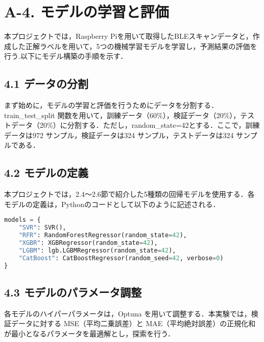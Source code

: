\section*{A-4. モデルの学習と評価}
本プロジェクトでは，Raspberry Piを用いて取得したBLEスキャンデータと，作成した正解ラベルを用いて，5つの機械学習モデルを学習し，予測結果の評価を行う.以下にモデル構築の手順を示す．

\subsection*{4.1 データの分割}
まず始めに，モデルの学習と評価を行うためにデータを分割する．train\_test\_split 関数を用いて，訓練データ（60\%），検証データ（20\%），テストデータ（20\%）に分割する．ただし，random\_state=42とする．ここで，訓練データは972 サンプル，検証データは324 サンプル，テストデータは324 サンプルである．

\subsection*{4.2 モデルの定義}
本プロジェクトでは，2.4～2.6節で紹介した5種類の回帰モデルを使用する．各モデルの定義は，Pythonのコードとして以下のように記述される．
\begin{lstlisting}[style=mystyle, language=Python, caption=回帰モデルの定義, label={models}]
models = {
    "SVR": SVR(),
    "RFR": RandomForestRegressor(random_state=42),
    "XGBR": XGBRegressor(random_state=42),
    "LGBM": lgb.LGBMRegressor(random_state=42),
    "CatBoost": CatBoostRegressor(random_seed=42, verbose=0)
}
\end{lstlisting}

\subsection*{4.3 モデルのパラメータ調整}
各モデルのハイパーパラメータは，Optuna を用いて調整する．本実験では，検証データに対する MSE（平均二乗誤差）と MAE（平均絶対誤差）の正規化和が最小となるパラメータを最適解とし，探索を行う．


